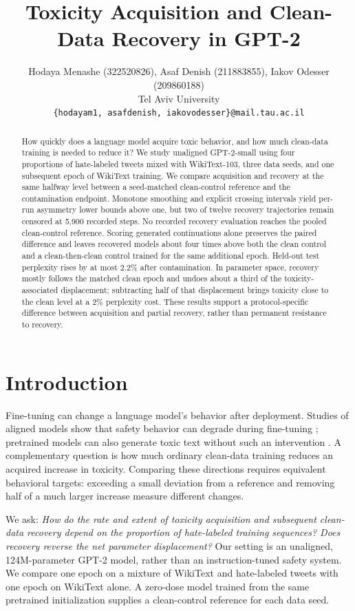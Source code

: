 \documentclass[11pt,a4paper]{article}
\title{Toxicity Acquisition and Clean-Data Recovery in GPT-2}
\author{Hodaya Menashe (322520826), Asaf Denish (211883855), Iakov Odesser (209860188) \\
Tel Aviv University \\
\texttt{\{hodayam1, asafdenish, iakovodesser\}@mail.tau.ac.il}}
\begin{document}
\maketitle

\begin{abstract}
How quickly does a language model acquire toxic behavior, and how much clean-data training is needed to reduce it? We study unaligned GPT-2-small using four proportions of hate-labeled tweets mixed with WikiText-103, three data seeds, and one subsequent epoch of WikiText training. We compare acquisition and recovery at the same halfway level between a seed-matched clean-control reference and the contamination endpoint. Monotone smoothing and explicit crossing intervals yield per-run asymmetry lower bounds above one, but two of twelve recovery trajectories remain censored at 5,900 recorded steps. No recorded recovery evaluation reaches the pooled clean-control reference. Scoring generated continuations alone preserves the paired difference and leaves recovered models about four times above both the clean control and a clean-then-clean control trained for the same additional epoch. Held-out test perplexity rises by at most 2.2\% after contamination. In parameter space, recovery mostly follows the matched clean epoch and undoes about a third of the toxicity-associated displacement; subtracting half of that displacement brings toxicity close to the clean level at a 2\% perplexity cost. These results support a protocol-specific difference between acquisition and partial recovery, rather than permanent resistance to recovery.
\end{abstract}

\section{Introduction}
Fine-tuning can change a language model's behavior after deployment. Studies of aligned models show that safety behavior can degrade during fine-tuning \citep{qi2023fine}; pretrained models can also generate toxic text without such an intervention \citep{gehman2020realtoxicityprompts}. A complementary question is how much ordinary clean-data training reduces an acquired increase in toxicity. Comparing these directions requires equivalent behavioral targets: exceeding a small deviation from a reference and removing half of a much larger increase measure different changes.

We ask: \emph{How do the rate and extent of toxicity acquisition and subsequent clean-data recovery depend on the proportion of hate-labeled training sequences? Does recovery reverse the net parameter displacement?} Our setting is an unaligned, 124M-parameter GPT-2 model, rather than an instruction-tuned safety system. We compare one epoch on a mixture of WikiText and hate-labeled tweets with one epoch on WikiText alone. A zero-dose model trained from the same pretrained initialization supplies a clean-control reference for each data seed.
\end{document}
